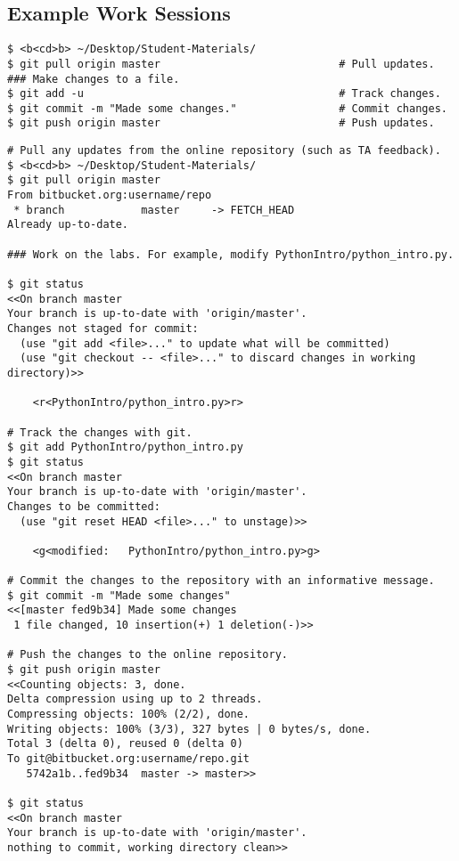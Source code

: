 
\subsection*{Example Work Sessions}

\begin{lstlisting}
$ <b<cd>b> ~/Desktop/Student-Materials/
$ git pull origin master                            # Pull updates.
### Make changes to a file.
$ git add -u                                        # Track changes.
$ git commit -m "Made some changes."                # Commit changes.
$ git push origin master                            # Push updates.
\end{lstlisting}

\begin{lstlisting}
# Pull any updates from the online repository (such as TA feedback).
$ <b<cd>b> ~/Desktop/Student-Materials/
$ git pull origin master
From bitbucket.org:username/repo
 * branch            master     -> FETCH_HEAD
Already up-to-date.

### Work on the labs. For example, modify PythonIntro/python_intro.py.

$ git status
<<On branch master
Your branch is up-to-date with 'origin/master'.
Changes not staged for commit:
  (use "git add <file>..." to update what will be committed)
  (use "git checkout -- <file>..." to discard changes in working directory)>>

    <r<PythonIntro/python_intro.py>r>

# Track the changes with git.
$ git add PythonIntro/python_intro.py
$ git status
<<On branch master
Your branch is up-to-date with 'origin/master'.
Changes to be committed:
  (use "git reset HEAD <file>..." to unstage)>>

    <g<modified:   PythonIntro/python_intro.py>g>

# Commit the changes to the repository with an informative message.
$ git commit -m "Made some changes"
<<[master fed9b34] Made some changes
 1 file changed, 10 insertion(+) 1 deletion(-)>>

# Push the changes to the online repository.
$ git push origin master
<<Counting objects: 3, done.
Delta compression using up to 2 threads.
Compressing objects: 100% (2/2), done.
Writing objects: 100% (3/3), 327 bytes | 0 bytes/s, done.
Total 3 (delta 0), reused 0 (delta 0)
To git@bitbucket.org:username/repo.git
   5742a1b..fed9b34  master -> master>>

$ git status
<<On branch master
Your branch is up-to-date with 'origin/master'.
nothing to commit, working directory clean>>
\end{lstlisting}
